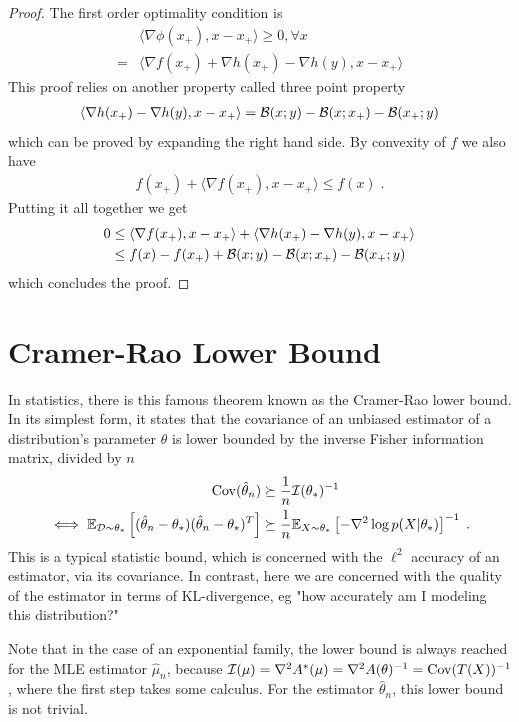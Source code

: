 \documentclass{article}
\newcommand*{\expect}[2][]{\ensuremath{\mathbb{E}_{#1} \left[ #2 \right] }} %
\newcommand{\logpart}{A}
\newcommand{\conj}{\logpart^*}
\newcommand{\natp}{\theta}
\begin{document}
\begin{proof}
	The first order optimality condition is
	\begin{align}
		&\langle \nabla \phi (x_+) , x -  x_+ \rangle \geq 0, \forall x \\
		=& \langle \nabla f(x_+) + \nabla h(x_+) - \nabla h (y), x - x_+ \rangle  
	\end{align}
	This proof relies on another property called three point property 
	\begin{align}
		\langle \nabla h(x_+) - \nabla h (y), x - x_+ \rangle  ={\mathcal B}(x;y) -{\mathcal B}(x;x_+) - {\mathcal B}(x_+;y) 
	\end{align}
	which can be proved by expanding the right hand side.
	By convexity of $f$ we also have 
	\begin{align}
		 f(x_+) + \langle \nabla f(x_+), x - x_+ \rangle \leq f(x) \; .
	\end{align} 
	Putting it all together we get
	\begin{align}
		0 
		&\leq  \langle \nabla f(x_+), x - x_+ \rangle + \langle \nabla h(x_+) - \nabla h (y), x - x_+ \rangle  \\
		&\leq f(x) - f(x_+) + {\mathcal B}(x;y) -{\mathcal B}(x;x_+) - {\mathcal B}(x_+;y)
	\end{align}
	which concludes the proof.
\end{proof}


\section{Cramer-Rao Lower Bound}
In statistics, there is this famous theorem known as the Cramer-Rao lower bound. In its simplest form, it states that the covariance of an unbiased estimator of a distribution's parameter $\natp$ is lower bounded by the inverse Fisher information matrix, divided by $n$
\begin{align}
    \Cov(\hat \natp_n)  
    &\succeq \inv{n} \cI(\natp_*)^{-1} \\
    \iff
    \expect[\cD\sim \natp_*]{(\hat \natp_n - \natp_*)(\hat \natp_n - \natp_*)^T}
    &\succeq \inv{n} \expect[X\sim \natp_*]{-\nabla^2 \log p(X|\natp_*)}^{-1} \; .
\end{align}
This is a typical statistic bound, which is concerned with the $\ell^2$ accuracy of an estimator, via its covariance. In contrast, here we are concerned with the quality of the estimator in terms of KL-divergence, eg "how accurately am I modeling this distribution?"

Note that in the case of an exponential family, the lower bound is always reached for the MLE estimator $\hat \mu_n$, because $\cI(\mu) = \nabla^2 \conj(\mu) = \nabla^2 \logpart(\natp)^{-1} = \Cov(T(X))^{-1}$, where the first step takes some calculus. For the estimator $\hat \natp_n$, this lower bound is not trivial.
\end{document}
